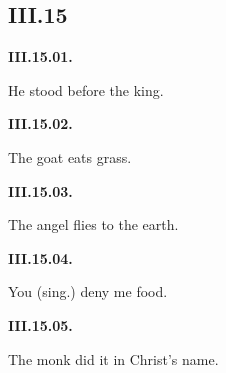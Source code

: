 \subsection*{III.15}

\par\begin{minipage}{\linewidth}\raggedright
\textbf{III.15.01.}

He stood before the king.

\end{minipage}\par\addvspace{4pt}

\par\begin{minipage}{\linewidth}\raggedright
\textbf{III.15.02.}

The goat eats grass.

\end{minipage}\par\addvspace{4pt}

\par\begin{minipage}{\linewidth}\raggedright
\textbf{III.15.03.}

The angel flies to the earth.

\end{minipage}\par\addvspace{4pt}

\par\begin{minipage}{\linewidth}\raggedright
\textbf{III.15.04.}

You (sing.) deny me food.

\end{minipage}\par\addvspace{4pt}

\par\begin{minipage}{\linewidth}\raggedright
\textbf{III.15.05.}

The monk did it in Christ’s name.

\end{minipage}\par\addvspace{4pt}

